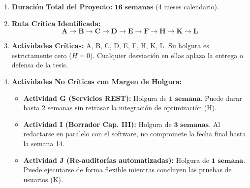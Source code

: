 \documentclass[11pt,a4paper]{article}
\begin{document}
\begin{tcolorbox}[colback=white, colframe=utiNavy, arc=4pt, title={\textbf{\color{white}SÍNTESIS DE RESULTADOS OPERATIVOS}}, fonttitle=\bfseries\small]
\begin{enumerate}\setlength\itemsep{3pt}\small
    \item \textbf{Duración Total del Proyecto:} $\mathbf{16\text{ semanas}}$ (4 meses calendario).
    \item \textbf{Ruta Crítica Identificada:}
    $$\mathbf{A \longrightarrow B \longrightarrow C \longrightarrow D \longrightarrow E \longrightarrow F \longrightarrow H \longrightarrow K \longrightarrow L}$$
    \item \textbf{Actividades Críticas:} A, B, C, D, E, F, H, K, L. Su holgura es estrictamente cero ($H = 0$). Cualquier desviación en ellas aplaza la entrega o defensa de la tesis.
    \item \textbf{Actividades No Críticas con Margen de Holgura:}
    \begin{itemize}\footnotesize
        \item \textbf{Actividad G (Servicios REST):} Holgura de $\mathbf{1\text{ semana}}$. Puede durar hasta 2 semanas sin retrasar la integración de optimización (H).
        \item \textbf{Actividad I (Borrador Cap. III):} Holgura de $\mathbf{3\text{ semanas}}$. Al redactarse en paralelo con el software, no compromete la fecha final hasta la semana 14.
        \item \textbf{Actividad J (Re-auditorías automatizadas):} Holgura de $\mathbf{1\text{ semana}}$. Puede ejecutarse de forma flexible mientras concluyen las pruebas de usuarios (K).
    \end{itemize}
\end{enumerate}
\end{tcolorbox}
\end{document}
